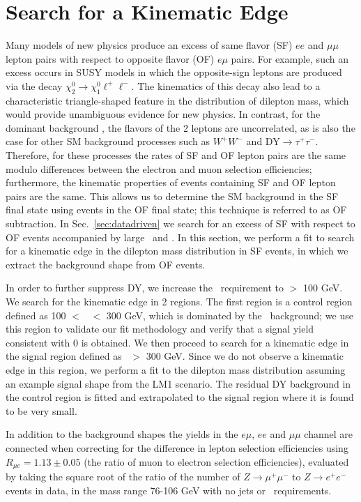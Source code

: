 \section{Search for a Kinematic Edge}
\label{sec:fit}

Many models of new physics produce an excess of same flavor (SF) $ee$ and $\mu\mu$ lepton pairs
with respect to opposite flavor (OF) $e\mu$ pairs. For example, such an excess occurs in SUSY models
in which the opposite-sign leptons are produced via the decay $\chi_2^0 \to \chi_1^0 \ell^+\ell^-$.
The kinematics of this decay also lead to a characteristic triangle-shaped feature in the distribution
of dilepton mass, which would provide unambiguous evidence for new physics.
In contrast, for the dominant background \ttbar, the flavors of the 2 leptons are uncorrelated,
as is also the case for other SM background processes such as $W^+W^-$ and DY$\to\tau^+\tau^-$.
Therefore, for these processes the rates of SF and OF lepton pairs are the same modulo differences
between the electron and muon selection efficiencies; 
furthermore, the kinematic properties of events containing SF and OF lepton pairs are the same. 
This allows us to determine the SM background in the SF final state using events in the OF
final state; this technique is referred to as OF subtraction. In Sec.~\ref{sec:datadriven}
we search for an excess of SF with respect to OF events accompanied by large \MET\ and \Ht. 
In this section, we perform a fit to search for a kinematic edge in the dilepton mass distribution 
in SF events, in which we extract the background shape from OF events.

In order to further suppress DY, we increase the \MET\ requirement to \MET $>$ 100 GeV. 
We search for the kinematic edge in 2 regions.  The first region is a control region defined
as 100 $<$ \Ht\ $<$ 300 GeV, which is dominated by the \ttbar\ background; we use 
this region to validate our fit methodology and verify that a signal yield consistent with 0 
is obtained. We then proceed to search for a kinematic edge in the signal region defined as 
\Ht\ $>$ 300 GeV. Since we do not observe a kinematic edge in this region, we perform a 
fit to the dilepton mass distribution assuming an example signal shape from the LM1 scenario.
The residual DY background in the control region is fitted and extrapolated
to the signal region where it is found to be very small.


In addition to the background shapes the yields in the $e\mu$, $ee$ and $\mu\mu$
channel are connected when correcting for the difference in lepton selection efficiencies
using $R_{\mu e} = 1.13 \pm 0.05$ (the ratio of muon to electron selection efficiencies),
evaluated by taking the square root of the ratio of the number of 
$Z \to \mu^+\mu^-$ to $Z \to e^+e^-$ events in data, in the mass range 76-106 GeV with no jets or 
\met\ requirements. 
 
